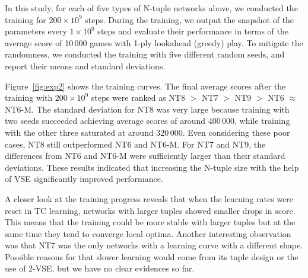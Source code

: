In this study, for each of five types of N-tuple networks above, we conducted the training for $200 \times 10^{9}$ steps.  During the training, we output the snapshot of the parameters every $1 \times 10^9$ steps and evaluate their performance in terms of the average score of 10\,000 games with 1-ply lookahead (greedy) play.
To mitigate the randomness, we conducted the training with five different random seeds, and report their means and standard deviations.

Figure~\ref{fig:exp2} shows the training curves.
The final average scores after the training with $200 \times 10^9$ steps were ranked as \textsf{NT8} $>$ \textsf{NT7} $>$ \textsf{NT9} $>$ \textsf{NT6} $\approx$ \textsf{NT6-M}.
The standard deviation for \textsf{NT8} was very large because training with two seeds succeeded achieving average scores of around 400\,000, while training with the other three saturated at around 320\,000.
Even considering these poor cases, \textsf{NT8} still outperformed \textsf{NT6} and \textsf{NT6-M}.
For \textsf{NT7} and \textsf{NT9}, the differences from \textsf{NT6} and \textsf{NT6-M} were sufficiently larger than their standard deviations.
These results indicated that increasing the N-tuple size with the help of VSE significantly improved performance.

A closer look at the training progress reveals that when the learning rates were reset in TC learning, networks with larger tuples showed smaller drops in score. This means that the training could be more stable with larger tuples but at the same time they tend to converge local optima.
Another interesting observation was that \textsf{NT7} was the only networks with a learning curve with a different shape.  Possible reasons for that slower learning would come from its tuple design or the use of 2-VSE, but we have no clear evidences so far.

